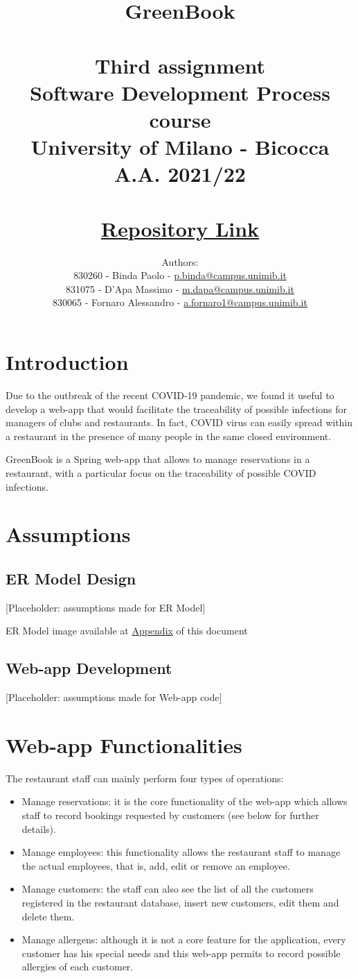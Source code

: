\documentclass{article}
\title{\textbf{GreenBook}\\~\\
    Third assignment\\
    \small Software Development Process course\\
        University of Milano - Bicocca\\
        A.A. 2021/22\\~\\
        \href{https://gitlab.com/massimino96/2021_assignment3_greenbook/}{Repository Link}}
\author{Authors:\\
    830260 - Binda Paolo - \href{mailto:p.binda@campus.unimib.it}{p.binda@campus.unimib.it}\\
    831075 - D'Apa Massimo - \href{mailto:m.dapa@campus.unimib.it}{m.dapa@campus.unimib.it}\\
    830065 - Fornaro Alessandro - \href{mailto:a.fornaro1@campus.unimib.it}{a.fornaro1@campus.unimib.it}}
\date{}
\begin{document}
\setlength{\parindent}{0em}
\setlength{\parskip}{1em}

\maketitle
\thispagestyle{empty}

\cleardoublepage
\setcounter{page}{1}

\section*{Introduction}

Due to the outbreak of the recent COVID-19 pandemic, we found it useful to develop a web-app that would facilitate the traceability of possible infections for managers of clubs and restaurants. In fact, COVID virus can easily spread within a restaurant in the presence of many people in the same closed environment.

GreenBook is a Spring web-app that allows to manage reservations in a restaurant, with a particular focus on the traceability of possible COVID infections.

\section*{Assumptions}
\subsection*{ER Model Design}
[Placeholder: assumptions made for ER Model]

ER Model image available at \hyperref[appendix:A]{Appendix} of this document

\subsection*{Web-app Development}
[Placeholder: assumptions made for Web-app code]

\section*{Web-app Functionalities}
The restaurant staff can mainly perform four types of operations:
\begin{itemize}
    \item Manage reservations: it is the core functionality of the web-app which allows staff to record bookings requested by customers (see below for further details).
    \item Manage employees: this functionality allows the restaurant staff to manage the actual employees, that is, add, edit or remove an employee.
    \item Manage customers: the staff can also see the list of all the customers registered in the restaurant database, insert new customers, edit them and delete them.
    \item Manage allergens: although it is not a core feature for the application, every customer has his special needs and this web-app permits to record possible allergies of each customer.
\end{itemize}
\end{document}
